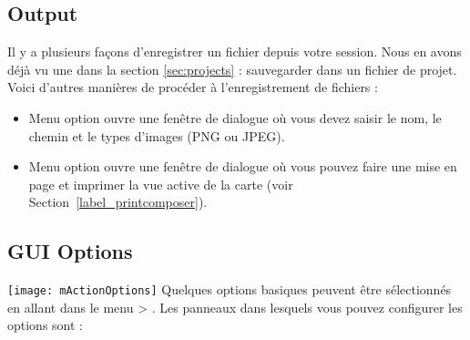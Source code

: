 \subsection{Output}\label{sec:output}
Il y a plusieurs façons d'enregistrer un fichier depuis votre session. Nous en avons déjà vu une dans la section \ref{sec:projects} : sauvegarder dans un fichier de projet.
Voici d'autres manières de procéder à l'enregistrement de fichiers :
\begin{itemize}
\item Menu option  ouvre une fenêtre de dialogue où vous devez saisir le nom, le chemin et le types d'images (PNG ou JPEG).
\item Menu option  ouvre une fenêtre de dialogue où vous pouvez faire une mise en page et imprimer la vue active de la carte (voir Section~\ref{label_printcomposer}).
\end{itemize}


\subsection{GUI Options}
\label{subsec:gui_options}
\texttt{[image: mActionOptions]} 
Quelques options basiques peuvent être sélectionnés en allant dans le menu  >
. Les panneaux dans lesquels vous pouvez configurer les options sont :

%

